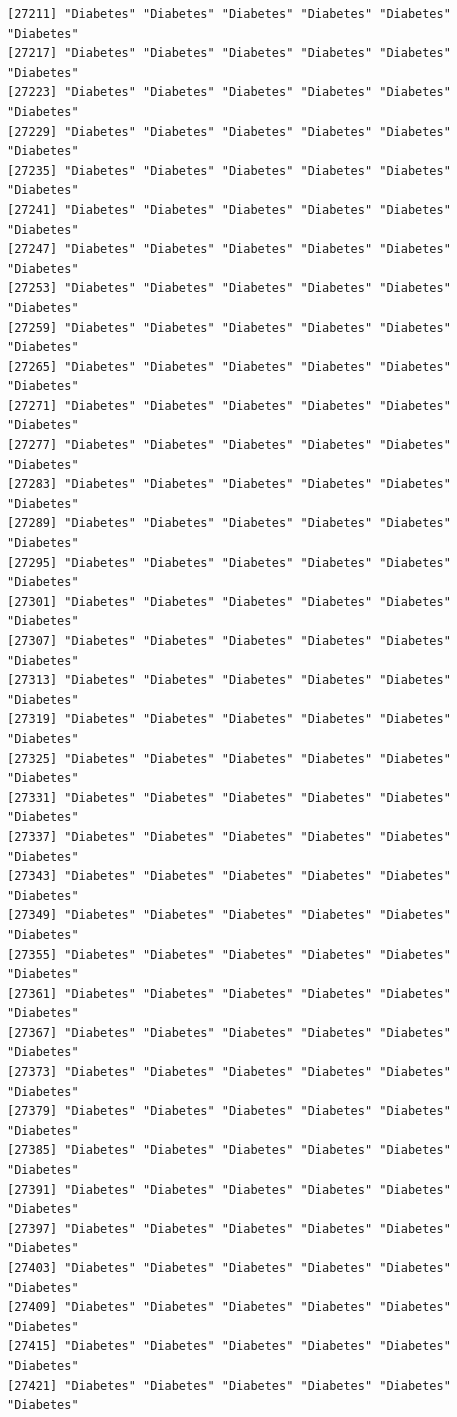 \documentclass[
  letterpaper,
  DIV=11,
  numbers=noendperiod]{scrartcl}
\begin{document}
\begin{verbatim}
[27211] "Diabetes" "Diabetes" "Diabetes" "Diabetes" "Diabetes" "Diabetes"
[27217] "Diabetes" "Diabetes" "Diabetes" "Diabetes" "Diabetes" "Diabetes"
[27223] "Diabetes" "Diabetes" "Diabetes" "Diabetes" "Diabetes" "Diabetes"
[27229] "Diabetes" "Diabetes" "Diabetes" "Diabetes" "Diabetes" "Diabetes"
[27235] "Diabetes" "Diabetes" "Diabetes" "Diabetes" "Diabetes" "Diabetes"
[27241] "Diabetes" "Diabetes" "Diabetes" "Diabetes" "Diabetes" "Diabetes"
[27247] "Diabetes" "Diabetes" "Diabetes" "Diabetes" "Diabetes" "Diabetes"
[27253] "Diabetes" "Diabetes" "Diabetes" "Diabetes" "Diabetes" "Diabetes"
[27259] "Diabetes" "Diabetes" "Diabetes" "Diabetes" "Diabetes" "Diabetes"
[27265] "Diabetes" "Diabetes" "Diabetes" "Diabetes" "Diabetes" "Diabetes"
[27271] "Diabetes" "Diabetes" "Diabetes" "Diabetes" "Diabetes" "Diabetes"
[27277] "Diabetes" "Diabetes" "Diabetes" "Diabetes" "Diabetes" "Diabetes"
[27283] "Diabetes" "Diabetes" "Diabetes" "Diabetes" "Diabetes" "Diabetes"
[27289] "Diabetes" "Diabetes" "Diabetes" "Diabetes" "Diabetes" "Diabetes"
[27295] "Diabetes" "Diabetes" "Diabetes" "Diabetes" "Diabetes" "Diabetes"
[27301] "Diabetes" "Diabetes" "Diabetes" "Diabetes" "Diabetes" "Diabetes"
[27307] "Diabetes" "Diabetes" "Diabetes" "Diabetes" "Diabetes" "Diabetes"
[27313] "Diabetes" "Diabetes" "Diabetes" "Diabetes" "Diabetes" "Diabetes"
[27319] "Diabetes" "Diabetes" "Diabetes" "Diabetes" "Diabetes" "Diabetes"
[27325] "Diabetes" "Diabetes" "Diabetes" "Diabetes" "Diabetes" "Diabetes"
[27331] "Diabetes" "Diabetes" "Diabetes" "Diabetes" "Diabetes" "Diabetes"
[27337] "Diabetes" "Diabetes" "Diabetes" "Diabetes" "Diabetes" "Diabetes"
[27343] "Diabetes" "Diabetes" "Diabetes" "Diabetes" "Diabetes" "Diabetes"
[27349] "Diabetes" "Diabetes" "Diabetes" "Diabetes" "Diabetes" "Diabetes"
[27355] "Diabetes" "Diabetes" "Diabetes" "Diabetes" "Diabetes" "Diabetes"
[27361] "Diabetes" "Diabetes" "Diabetes" "Diabetes" "Diabetes" "Diabetes"
[27367] "Diabetes" "Diabetes" "Diabetes" "Diabetes" "Diabetes" "Diabetes"
[27373] "Diabetes" "Diabetes" "Diabetes" "Diabetes" "Diabetes" "Diabetes"
[27379] "Diabetes" "Diabetes" "Diabetes" "Diabetes" "Diabetes" "Diabetes"
[27385] "Diabetes" "Diabetes" "Diabetes" "Diabetes" "Diabetes" "Diabetes"
[27391] "Diabetes" "Diabetes" "Diabetes" "Diabetes" "Diabetes" "Diabetes"
[27397] "Diabetes" "Diabetes" "Diabetes" "Diabetes" "Diabetes" "Diabetes"
[27403] "Diabetes" "Diabetes" "Diabetes" "Diabetes" "Diabetes" "Diabetes"
[27409] "Diabetes" "Diabetes" "Diabetes" "Diabetes" "Diabetes" "Diabetes"
[27415] "Diabetes" "Diabetes" "Diabetes" "Diabetes" "Diabetes" "Diabetes"
[27421] "Diabetes" "Diabetes" "Diabetes" "Diabetes" "Diabetes" "Diabetes"

\end{verbatim}
\end{document}
